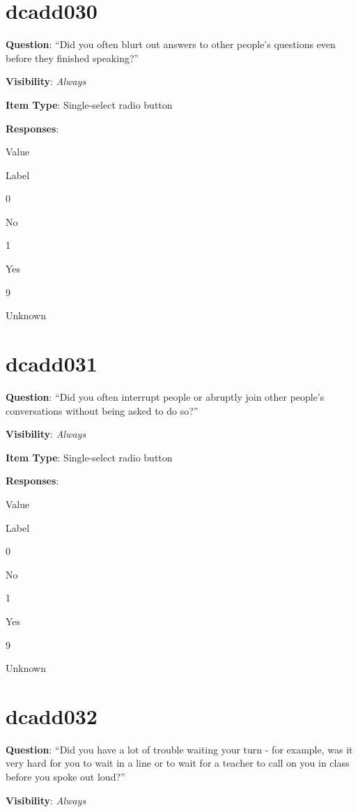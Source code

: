 \documentclass[]{book}
\begin{document}
\hypertarget{dcadd030}{%
\section{dcadd030}\label{dcadd030}}

\textbf{Question}: ``Did you often blurt out answers to other people's questions even before they finished speaking?''

\textbf{Visibility}: \emph{Always}

\textbf{Item Type}: Single-select radio button

\textbf{Responses}:

Value

Label

0

No

1

Yes

9

Unknown

\hypertarget{dcadd031}{%
\section{dcadd031}\label{dcadd031}}

\textbf{Question}: ``Did you often interrupt people or abruptly join other people's conversations without being asked to do so?''

\textbf{Visibility}: \emph{Always}

\textbf{Item Type}: Single-select radio button

\textbf{Responses}:

Value

Label

0

No

1

Yes

9

Unknown

\hypertarget{dcadd032}{%
\section{dcadd032}\label{dcadd032}}

\textbf{Question}: ``Did you have a lot of trouble waiting your turn - for example, was it very hard for you to wait in a line or to wait for a teacher to call on you in class before you spoke out loud?''

\textbf{Visibility}: \emph{Always}
\end{document}
